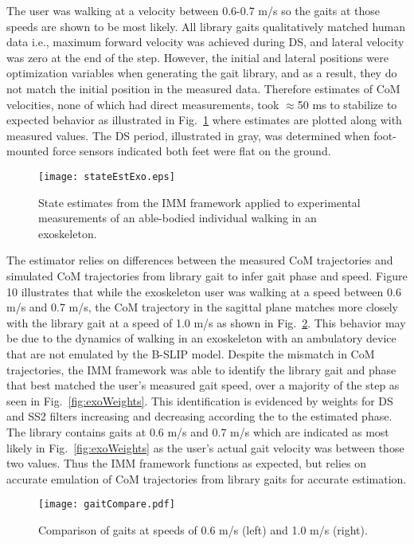 The user was walking at a velocity between 0.6-0.7 m/s so the gaits at those speeds are shown to be most likely. All library gaits qualitatively matched human data i.e., maximum forward velocity was achieved during DS, and lateral velocity was zero at the end of the step. However, the initial and lateral positions were optimization variables when generating the gait library, and as a result, they do not match the initial position in the measured data. Therefore estimates of CoM velocities, none of which had direct measurements, took $ \approx $50 ms to stabilize to expected behavior as illustrated in Fig.~\ref{fig:exoState} where estimates are plotted along with measured values. The DS period, illustrated in gray, was determined when foot-mounted force sensors indicated both feet were flat on the ground.
\begin{figure}
	\centering
	\texttt{[image: stateEstExo.eps]}
	\caption{State estimates from the IMM framework applied to experimental measurements of an able-bodied individual walking in an exoskeleton.}\label{fig:exoState}
\end{figure}

The estimator relies on differences between the measured CoM trajectories and simulated CoM trajectories from library gait to infer gait phase and speed. Figure 10 illustrates that while the exoskeleton user was walking at a speed between 0.6 m/s and 0.7 m/s, the CoM trajectory in the sagittal plane matches more closely with the library gait at a speed of 1.0 m/s as shown in Fig.~\ref{fig:compare}. This behavior may be due to the dynamics of walking in an exoskeleton with an ambulatory device that are not emulated by the B-SLIP model. Despite the mismatch in CoM trajectories, the IMM framework was able to identify the library gait and phase that best matched the user's measured gait speed, over a majority of the step as seen in Fig.~\ref{fig:exoWeights}. This identification is evidenced by weights for DS and SS2 filters increasing and decreasing according the to the estimated phase. The library contains gaits at 0.6 m/s and 0.7 m/s which are indicated as most likely in Fig.~\ref{fig:exoWeights} as the user's actual gait velocity was between those two values. Thus the IMM framework functions as expected, but relies on accurate emulation of CoM trajectories from library gaits for accurate estimation.

\begin{figure}
	\centering
	\texttt{[image: gaitCompare.pdf]}
	\caption{Comparison of gaits at speeds of 0.6 m/s  (left) and 1.0 m/s  (right).}\label{fig:compare}
\end{figure}

